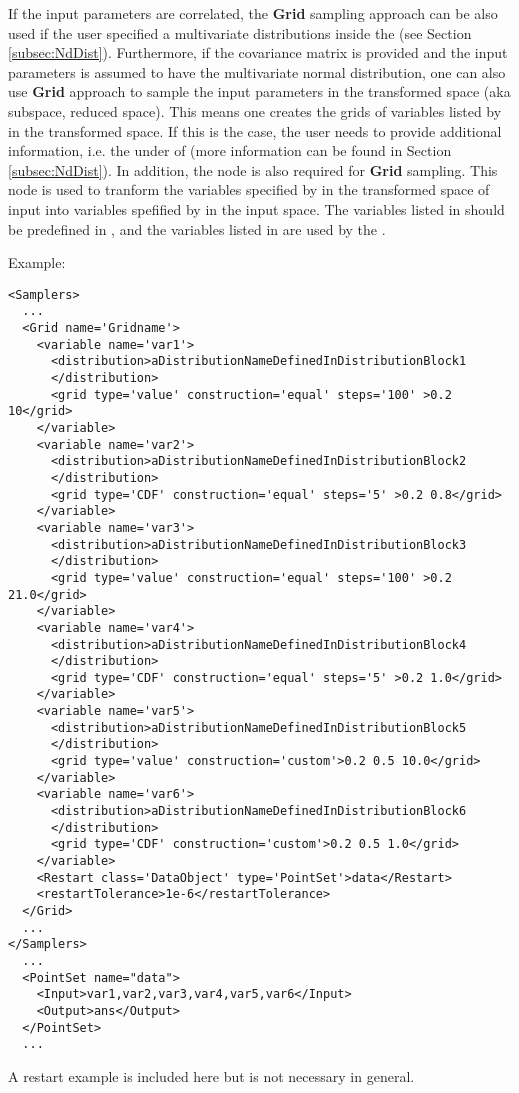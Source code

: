If the input parameters are correlated, the \textbf{Grid} sampling approach can be also used if the user specified a
multivariate distributions inside the  (see Section \ref{subsec:NdDist}). Furthermore, if the
covariance matrix is provided and the input parameters is assumed to have the multivariate normal distribution, one can also use
\textbf{Grid} approach to sample the input parameters in the transformed space (aka subspace, reduced space). This means one creates
the grids of variables listed by  in the transformed space. If this is the case, the user needs to
provide additional information, i.e. the  under  of 
(more information can be found in Section \ref{subsec:NdDist}). In addition, the node  is also
required for \textbf{Grid} sampling. This node is used to tranform the variables specified by  in the
transformed space of input into variables spefified by  in the input space. The variables listed
in  should be predefined in , and the variables listed in 
are used by the .



Example:
\begin{lstlisting}[style=XML,morekeywords={construction,steps,lowerBound,upperBound}]
<Samplers>
  ...
  <Grid name='Gridname'>
    <variable name='var1'>
      <distribution>aDistributionNameDefinedInDistributionBlock1
      </distribution>
      <grid type='value' construction='equal' steps='100' >0.2 10</grid>
    </variable>
    <variable name='var2'>
      <distribution>aDistributionNameDefinedInDistributionBlock2
      </distribution>
      <grid type='CDF' construction='equal' steps='5' >0.2 0.8</grid>
    </variable>
    <variable name='var3'>
      <distribution>aDistributionNameDefinedInDistributionBlock3
      </distribution>
      <grid type='value' construction='equal' steps='100' >0.2 21.0</grid>
    </variable>
    <variable name='var4'>
      <distribution>aDistributionNameDefinedInDistributionBlock4
      </distribution>
      <grid type='CDF' construction='equal' steps='5' >0.2 1.0</grid>
    </variable>
    <variable name='var5'>
      <distribution>aDistributionNameDefinedInDistributionBlock5
      </distribution>
      <grid type='value' construction='custom'>0.2 0.5 10.0</grid>
    </variable>
    <variable name='var6'>
      <distribution>aDistributionNameDefinedInDistributionBlock6
      </distribution>
      <grid type='CDF' construction='custom'>0.2 0.5 1.0</grid>
    </variable>
    <Restart class='DataObject' type='PointSet'>data</Restart>
    <restartTolerance>1e-6</restartTolerance>
  </Grid>
  ...
</Samplers>
  ...
  <PointSet name="data">
    <Input>var1,var2,var3,var4,var5,var6</Input>
    <Output>ans</Output>
  </PointSet>
  ...
\end{lstlisting}
\nb A restart example is included here but is not necessary in general.

